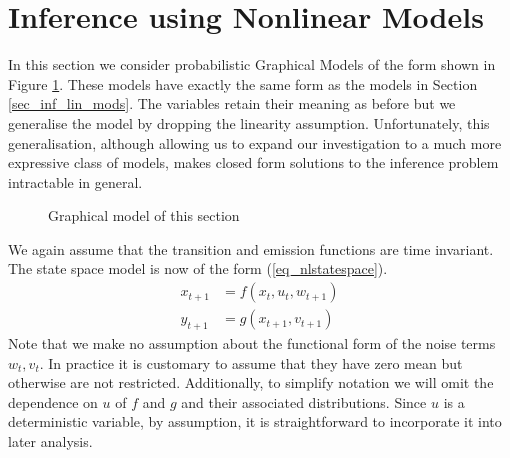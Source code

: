 \section{Inference using Nonlinear Models}
\label{sec_inf_nonlin_mods}
In this section we consider probabilistic Graphical Models of the form shown in Figure \ref{fig_nlmod}. These models have exactly the same form as the models in Section \ref{sec_inf_lin_mods}. The variables retain their meaning as before but we generalise the model by dropping the linearity assumption. Unfortunately, this generalisation, although allowing us to expand our investigation to a much more expressive class of models, makes closed form solutions to the inference problem intractable in general.   
\begin{figure}[H] 
\centering
{}
\caption{Graphical model of this section}
\label{fig_nlmod}
\end{figure}
We again assume that the transition and emission functions are time invariant. The state space model is now of the form (\ref{eq_nlstatespace}).
\begin{equation}
\begin{aligned}
x_{t+1} &= f(x_t, u_t, w_{t+1}) \\
y_{t+1} &= g(x_{t+1}, v_{t+1})
\end{aligned}
\label{eq_nlstatespace}
\end{equation}
Note that we make no assumption about the functional form of the noise terms $w_t,v_t$. In practice it is customary to assume that they have zero mean but otherwise are not restricted. Additionally, to simplify notation we will omit the dependence on $u$ of $f$ and $g$ and their associated distributions. Since $u$ is a deterministic variable, by assumption, it is straightforward to incorporate it into later analysis. 

